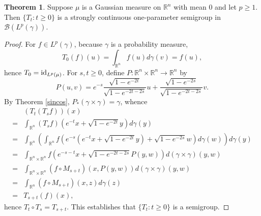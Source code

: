 \documentclass{article}
\newcommand{\id}{\ensuremath\mathrm{id}}
\theoremstyle{definition}
\newtheorem{theorem}{Theorem}
\theoremstyle{definition}
\begin{document}
\begin{theorem}
Suppose $\mu$ is a Gaussian measure on $\mathbb{R}^n$ with mean $0$ and let $p\geq 1$. 
Then 
$\{T_t:t \geq 0\}$ is a strongly continuous one-parameter semigroup in $\mathscr{B}(L^p(\gamma))$. 
\label{semigroup}
\end{theorem}
\begin{proof}
For $f \in L^p(\gamma)$, because $\gamma$ is a probability measure,
\[
T_0(f)(u) = 
 \int_{\mathbb{R}^n} f(u) d\gamma(v)
=f(u),
\]
hence $T_0 = \id_{L^p(\mu)}$. For $s,t \geq 0$,
define $P:\mathbb{R}^n \times \mathbb{R}^n \to \mathbb{R}^n$ by
\[
P(u,v) = e^{-s} \frac{\sqrt{1-e^{-2t}}}{\sqrt{1-e^{-2t-2s}}} u + \frac{\sqrt{1-e^{-2s}}}{\sqrt{1-e^{-2t-2s}}}v.
\]
By Theorem \ref{sincos}, $P_*(\gamma \times \gamma)=\gamma$, whence
\[
\begin{split}
&(T_t(T_s f))(x)\\
=&\int_{\mathbb{R}^n} (T_s f)\left(e^{-t}x+\sqrt{1-e^{-2t}}y \right)d\gamma(y)\\
=&\int_{\mathbb{R}^n} \left( \int_{\mathbb{R}^n} 
f\left(e^{-s}\left(e^{-t}x+\sqrt{1-e^{-2t}}y\right)+\sqrt{1-e^{-2s}}w\right) d\gamma(w) \right) d\gamma(y)\\
=&\int_{\mathbb{R}^n \times \mathbb{R}^n} f\left(e^{-s-t}x+\sqrt{1-e^{-2t-2s}} P(y,w) \right)
d(\gamma \times \gamma)(y,w)\\
=&\int_{\mathbb{R}^n \times \mathbb{R}^n} (f \circ M_{s+t})(x,P(y,w)) d(\gamma \times \gamma)(y,w)\\
=&\int_{\mathbb{R}^n} (f \circ M_{s+t})(x,z)  d\gamma(z)\\
=&T_{s+t}(f)(x),
\end{split}
\]
hence $T_t \circ T_s = T_{s+t}$. This establishes that $\{T_t: t \geq 0\}$ is a semigroup. 


\end{proof}
\end{document}
